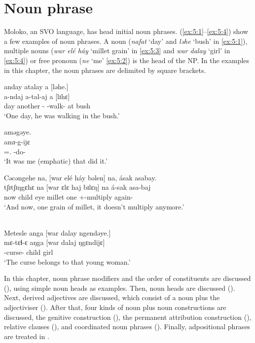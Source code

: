 \chapter[Noun phrase]{Noun phrase}\label{chap:5}
\hypertarget{RefHeading1211561525720847}{}
Moloko, an SVO language, has head initial noun phrases.  (\ref{ex:5:1}--\ref{ex:5:4}) show a few examples of noun phrases.  A noun (\textit{nafat}  ‘day’ and \textit{ləhe} ‘bush’ in \ref{ex:5:1}), multiple nouns (\textit{war elé háy} ‘millet grain’ in \ref{ex:5:3} and \textit{war dalay} ‘girl’ in \ref{ex:5:4}) or free pronoun (\textit{ne} ‘me’ \ref{ex:5:2}) is the head of the NP. In the examples in this chapter, the noun phrases are delimited by square brackets. 

\ea \label{ex:5:1}  anday  atalay   a  [ləhe.]\\
  a-ndaj a-tal-aj a  [lɪhɛ]\\
      day  another  \SSS-{\PRG}    \SSS-walk-{\CL}  at  bush\\
\glt  ‘One day, he was walking in the bush.’
\z

\ea \label{ex:5:2}\relax 
 [Ne  ahan]  aməgəye.\\
\gll      [nɛ  =ahaŋ] amɪ-g-ijɛ\\
      {\oneS}  =\SSS.{\POSS}  {\DEP}-do-{\CL}\\
\glt  ‘It was me (emphatic) that did it.’ 
\z

\ea \label{ex:5:3} 
 Cəcəngehe  na,  [war  elé  háy  bəlen]   na,  ásak  asabay.\\
\gll      tʃɪtʃɪŋgɛhɛ  na [war   ɛlɛ  haj   bɪlɛŋ] na  á-sak  asa-baj\\
      now  {\PSP}    child  eye  millet  one  {\PSP}  \SSS+{\IFV}-multiply again-{\NEG}\\
\glt  ‘And now, one grain of millet, it doesn’t multiply anymore.’
\z

\ea \label{ex:5:4}\\ 
  Metesle   anga  [war  dalay  ngendəye.]\\
\gll       mɛ-tɛɬ-ɛ aŋga  [war  dalaj  ŋgɛndijɛ]\\
      {\NOM}-curse-{\CL}  {\POSS}  child  girl  {\DEM}\\
\glt  ‘The curse belongs to that young woman.’
\z

In this chapter, noun phrase modifiers and the order of constituents are discussed (), using simple noun heads as examples. Then, noun heads are discussed (). Next, derived adjectives are discussed, which consist of a noun plus the adjectiviser (). After that, four kinds of noun plus noun constructions are discussed, the genitive construction (), the permanent attribution construction (), relative clauses (), and coordinated noun phrases (). Finally, adpositional phrases are treated in .

